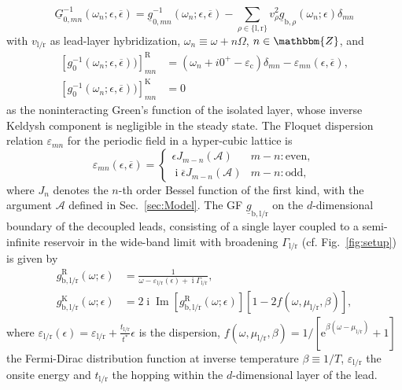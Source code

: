 \documentclass[aps,prb,groupedaddress,showpacs,twocolumn,superscriptaddress,10pt]{revtex4-2}
\newcommand{\ee}{\mathrm{e}}  %
\DeclareMathOperator*{\ii}{i} %
\DeclareMathOperator*{\iim}{Im}
\newcommand{\aamp}{\mathcal{A}}
\begin{document}
\begin{equation}\label{eq:non-int_InvGF} 
\underline{G}^{-1}_{0,mn}(\omega_n;\epsilon,\overline{\epsilon}) =  \underline{g}^{-1}_{0,mn}(\omega_n;\epsilon,\overline{\epsilon}) - \sum_{\rho\in\{\text{l},\text{r}\}}v^2_{\rho}\underline{g}_{\text{b},\rho}(\omega_n;\epsilon)\delta_{mn}
\end{equation}
with $v_{\text{l}/\text{r}}$ as lead-layer hybridization, $\omega_n \equiv \omega + n\Omega$, $n\in\mathbbm{Z}$, and 
%
\begin{equation}\label{eq:inv_non-int_lat_GF_comps}
\begin{split}
\left[ g^{-1}_{0}(\omega_n;\epsilon,\overline{\epsilon})) \right]^{\text{R}}_{mn} & = \left( \omega_n + i0^{+} -\varepsilon_{\text{c}} \right)\delta_{mn} - \varepsilon_{mn}(\epsilon,\overline{\epsilon}), \\
\left[ g^{-1}_{0}(\omega_n;\epsilon,\overline{\epsilon})) \right]^{\text{K}}_{mn} & = 0
\end{split}
\end{equation}
%
as the noninteracting Green's function of the isolated layer, whose inverse Keldysh component is negligible in the steady state. The Floquet dispersion relation $\varepsilon_{mn}$ for the periodic field in a hyper-cubic lattice is~\cite{ts.ok.08} 
%
\begin{equation}
\label{eq:Floquet_disp}
\varepsilon_{mn}(\epsilon,\overline{\epsilon}) = \begin{cases}
\epsilon J_{m-n}(\aamp) & m-n:\text{even}, \\
\ii\overline{\epsilon}J_{m-n}(\aamp) & m-n:\text{odd},
\end{cases}
\end{equation} 
% 
where $J_n$ denotes the $n$-th order Bessel function of the first kind, with the argument $\aamp$ defined in Sec.~\ref{sec:Model}. The  GF $\underline{g}_{\text{b},\text{l}/\text{r}}$ on the $d$-dimensional boundary of the decoupled leads,  consisting of a single layer coupled to a semi-infinite reservoir in the wide-band limit with broadening $\Gamma_{\text{l}/\text{r}}$ (cf. Fig.~\ref{fig:setup}) is given by
%  
\begin{align}
g^{\text{R}}_{\text{b},\text{l}/\text{r}}(\omega;\epsilon) &= \frac{1}{\omega-\varepsilon_{\text{l}/\text{r}}(\epsilon)+\ii\Gamma_{\text{l}/\text{r}}},\label{eq:retarded_bath_GF} \\
g^{\text{K}}_{\text{b},\text{l}/\text{r}}(\omega;\epsilon) &= 2\ii \iim[g_{\text{b},\text{l}/\text{r}}^{\text{R}}(\omega;\epsilon)][1-2f(\omega,\mu_{\text{l}/\text{r}},\beta)], \label{eq:keldysh_bath_GF}
\end{align} 
%
where $\varepsilon_{\text{l}/\text{r}}(\epsilon)=\varepsilon_{\text{l}/\text{r}} +\frac{t_{\text{l}/\text{r}}}{t^\ast}\epsilon$ is the dispersion, $f(\omega,\mu_{\text{l}/\text{r}},\beta)=1/[\ee^{\beta(\omega-\mu_{\text{l}/\text{r}})}+1]$ the Fermi-Dirac distribution function at inverse temperature $\beta \equiv 1/T$, $\varepsilon_{\text{l}/\text{r}}$ the onsite energy and $t_{\text{l}/\text{r}}$ the hopping within the $d$-dimensional layer of the lead.  
\end{document}
